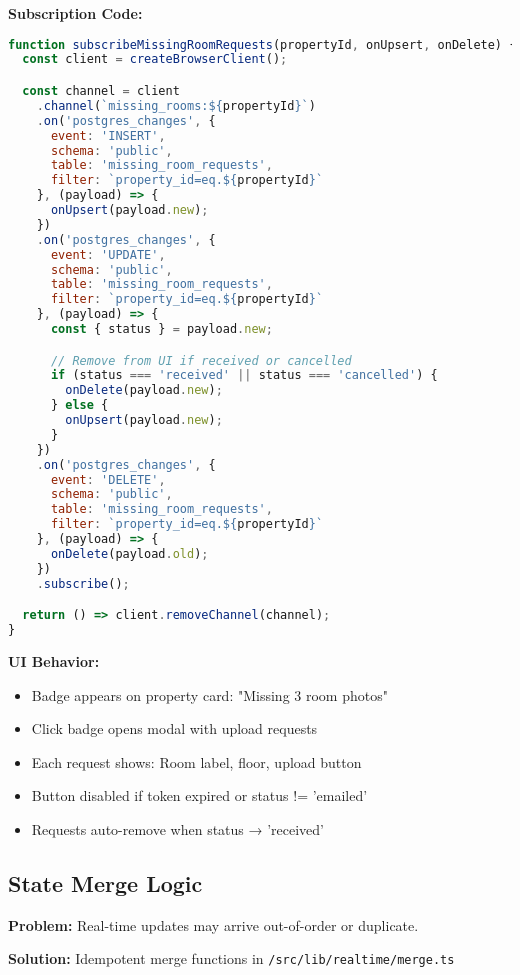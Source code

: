 \documentclass[11pt,a4paper]{article}
\begin{document}
\textbf{Subscription Code:}
\begin{lstlisting}[language=JavaScript, caption=Missing Room Requests Subscription]
function subscribeMissingRoomRequests(propertyId, onUpsert, onDelete) {
  const client = createBrowserClient();

  const channel = client
    .channel(`missing_rooms:${propertyId}`)
    .on('postgres_changes', {
      event: 'INSERT',
      schema: 'public',
      table: 'missing_room_requests',
      filter: `property_id=eq.${propertyId}`
    }, (payload) => {
      onUpsert(payload.new);
    })
    .on('postgres_changes', {
      event: 'UPDATE',
      schema: 'public',
      table: 'missing_room_requests',
      filter: `property_id=eq.${propertyId}`
    }, (payload) => {
      const { status } = payload.new;

      // Remove from UI if received or cancelled
      if (status === 'received' || status === 'cancelled') {
        onDelete(payload.new);
      } else {
        onUpsert(payload.new);
      }
    })
    .on('postgres_changes', {
      event: 'DELETE',
      schema: 'public',
      table: 'missing_room_requests',
      filter: `property_id=eq.${propertyId}`
    }, (payload) => {
      onDelete(payload.old);
    })
    .subscribe();

  return () => client.removeChannel(channel);
}
\end{lstlisting}

\textbf{UI Behavior:}
\begin{itemize}
  \item Badge appears on property card: "Missing 3 room photos"
  \item Click badge opens modal with upload requests
  \item Each request shows: Room label, floor, upload button
  \item Button disabled if token expired or status != 'emailed'
  \item Requests auto-remove when status → 'received'
\end{itemize}

\subsection{State Merge Logic}

\textbf{Problem:} Real-time updates may arrive out-of-order or duplicate.

\textbf{Solution:} Idempotent merge functions in \texttt{/src/lib/realtime/merge.ts}
\end{document}
